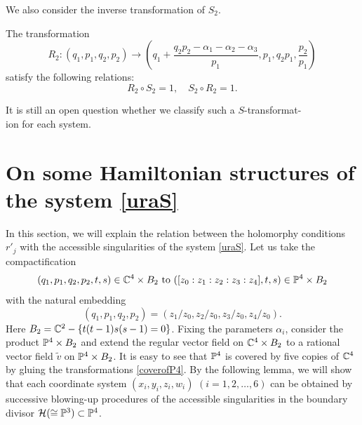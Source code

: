 We also consider the inverse transformation of $S_2$.
\begin{Lemma}\label{th:inininokaoka}
The transformation
\begin{equation}
R_2:(q_1,p_1,q_2,p_2) \rightarrow \left(q_1+\frac{q_2p_2-\alpha_1-\alpha_2-\alpha_3}{p_1},p_1,q_2p_1,\frac{p_2}{p_1}\right)
\end{equation}
satisfy the following relations\rm{:\rm}
\begin{equation}
R_2 \circ S_2=1, \quad S_2 \circ R_2=1.
\end{equation}
\end{Lemma}



\begin{Problem}
It is still an open question whether we classify such a $S$-transformat-\\
ion for each system.
\end{Problem}






\section{On some Hamiltonian structures of the system \eqref{uraS}}

In this section, we will explain the relation between the holomorphy conditions $r'_j$  with the accessible singularities of the system \eqref{uraS}. Let us take the compactification
\begin{equation*}
(q_1,p_1,q_2,p_2,t,s) \in {\Bbb C}^4 \times B_2 \  {\rm{to\rm}} \ ([z_0:z_1:z_2:z_3:z_4],t,s) \in {\Bbb P}^4 \times B_2
\end{equation*}
with the natural embedding
\begin{equation*}
(q_1,p_1,q_2,p_2)=(z_1/z_0,z_2/z_0,z_3/z_0,z_4/z_0).
\end{equation*}
Here $B_2={\Bbb C}^2-\{t(t-1)s(s-1)=0 \}$. Fixing the parameters $\alpha_i$, consider the product ${\Bbb P}^4 \times B_2$ and extend the regular vector field on ${\Bbb C}^4 \times B_2$ to a rational vector field $\tilde{v}$ on ${\Bbb P}^4 \times B_2$. It is easy to see that ${\Bbb P}^4$ is covered by five copies of ${\Bbb C}^4$ by gluing the transformations \eqref{coverofP4}. By the following lemma, we will show that each coordinate system $(x_i,y_i,z_i,w_i)$ $(i=1,2,\dots,6)$ can be obtained by successive blowing-up procedures of the accessible singularities in the boundary divisor ${\mathcal H} (\cong {\Bbb P}^3) \subset {\Bbb P}^4$.

